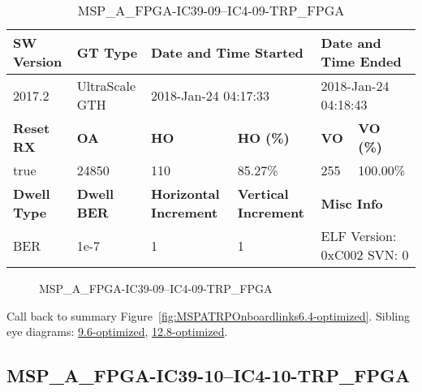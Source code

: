 \begin{table}[h]
\centering
\caption{MSP\_A\_FPGA-IC39-09--IC4-09-TRP\_FPGA}
\label{tab:MSPAFPGAIC3909IC409TRPFPGA6.4-optimized}
\begin{tabular}{@{}|l|l|l|l|l|l|@{}}
\toprule
\textbf{SW Version}                & \textbf{GT Type}   & \multicolumn{2}{l|}{\textbf{Date and Time Started}}            & \multicolumn{2}{l|}{\textbf{Date and Time Ended}}        \\ \midrule
2017.2                       & UltraScale GTH          & \multicolumn{2}{l|}{2018-Jan-24 04:17:33}                   & \multicolumn{2}{l|}{2018-Jan-24 04:18:43}               \\ \midrule
\textbf{Reset RX}                  & \textbf{OA} & \textbf{HO}   & \textbf{HO (\%)} & \textbf{VO} & \textbf{VO (\%)} \\ \midrule
true & 24850        & 110          & 85.27\%        & 255        & 100.00\%       \\ \midrule
\textbf{Dwell Type}                & \textbf{Dwell BER} & \textbf{Horizontal Increment} & \textbf{Vertical Increment}    & \multicolumn{2}{l|}{\textbf{Misc Info}}                  \\ \midrule
BER                            & 1e-7        & 1        & 1           & \multicolumn{2}{l|}{ELF Version: 0xC002 SVN: 0}                         \\ \bottomrule
\end{tabular}
\end{table}

\begin{figure}[h]
\caption{MSP\_A\_FPGA-IC39-09--IC4-09-TRP\_FPGA} \label{fig:MSPAFPGAIC3909IC409TRPFPGA6.4-optimized}
\end{figure}

Call back to summary Figure~\ref{fig:MSPATRPOnboardlinks6.4-optimized}.
Sibling eye diagrams: \hyperref[sec:MSPAFPGAIC3909IC409TRPFPGA9.6-optimized]{9.6-optimized}, \hyperref[sec:MSPAFPGAIC3909IC409TRPFPGA12.8-optimized]{12.8-optimized}.

\clearpage
\newpage


\subsection{MSP\_A\_FPGA-IC39-10--IC4-10-TRP\_FPGA}\label{sec:MSPAFPGAIC3910IC410TRPFPGA6.4-optimized}

